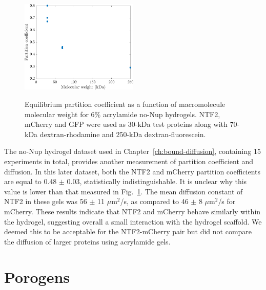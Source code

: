 \begin{figure}
\caption[Partition coefficient as a function of molecular weight.]{Equilibrium partition coefficient as a function of macromolecule molecular weight for 6\% acrylamide no-Nup hydrogels.  NTF2, mCherry and GFP were used as 30-kDa test proteins along with 70-kDa dextran-rhodamine and 250-kDa dextran-fluorescein.\\}
\centering
\includegraphics[width=0.5\textwidth]{figs/ch03/partition-coefficient-vs-mw}
\label{fig:pc-vs-mw}
\end{figure} 

The no-Nup hydrogel dataset used in Chapter~\ref{ch:bound-diffusion}, containing 15 experiments in total, provides another measurement of partition coefficient and diffusion.  In this later dataset, both the NTF2 and mCherry partition coefficients are equal to 0.48 $\pm$ 0.03, statistically indistinguishable.  It is unclear why this value is lower than that measured in Fig.~\ref{fig:pc-vs-mw}.  The mean diffusion constant of NTF2 in these gels was 56 $\pm$ 11 $\mu$m$^2$/s, as compared to 46 $\pm$ 8 $\mu$m$^2$/s for mCherry.  These results indicate that NTF2 and mCherry behave similarly within the hydrogel, suggesting overall a small interaction with the hydrogel scaffold.  We deemed this to be acceptable for the NTF2-mCherry pair but did not compare the diffusion of larger proteins using acrylamide gels.
%
%

\section{Porogens}

